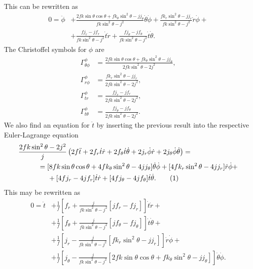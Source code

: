 \documentclass[english, parskip=full]{scrartcl}
\newcommand\numberthis{\addtocounter{equation}{1}\tag{\theequation}}
\newcommand{\kla}{}
\newcommand{\klam}{}
\begin{document}
This can be rewritten as
\begin{align}
0 = \ddot{\phi} &+ \frac{2fk\sin\theta\cos\theta + fk_\theta\sin^2\theta - jj_\theta}{fk\sin^2\theta - j^2} \dot{\theta}\dot{\phi} + \frac{fk_r\sin^2\theta - jj_r}{fk\sin^2\theta - j^2} \dot{r}\dot{\phi} + \\
&+ \frac{fj_r - jf_r}{fk\sin^2\theta - j^2} \dot{t}\dot{r} + \frac{fj_\theta - jf_\theta}{fk\sin^2\theta - j^2} \dot{t}\dot{\theta}.
\end{align}
The Christoffel symbols for $\phi$ are
\begin{align}
\Gamma^\phi_{\theta\phi} &= \frac{2fk\sin\theta\cos\theta + fk_\theta \sin^2\theta - jj_\theta}{2fk\sin^2\theta - 2j^2},\\
\Gamma^\phi_{r\phi} &= \frac{fk_r\sin^2\theta - jj_r}{2fk\sin^2\theta - 2j^2},\\
\Gamma^\phi_{tr} &= \frac{fj_r - jf_r}{2fk\sin^2\theta - 2j^2},\\
\Gamma^\phi_{t\theta} &= \frac{fj_\theta - jf_\theta}{2fk\sin^2\theta - 2j^2}.
\end{align}
We also find an equation for $\ddot{t}$ by inserting the previous result into the respective Euler-Lagrange equation
\begin{align*}
&\frac{2fk\sin^2\theta - 2j^2}{j} \kla\left( 2f\ddot{t} + 2f_r\dot{t}\dot{r} + 2f_\theta \dot{t}\dot{\theta} + 2j_r\dot{\phi}\dot{r} + 2j_\theta\dot{\phi}\dot{\theta} \right) = \\
&\hspace{1cm}= [8fk\sin\theta\cos\theta + 4fk_\theta\sin^2\theta  -4jj_\theta] \dot{\theta}\dot{\phi} + [4fk_r\sin^2\theta - 4jj_r] \dot{r}\dot{\phi} +\\
&\hspace{1.5cm} + [4fj_r - 4jf_r] \dot{t}\dot{r} + [4fj_\theta - 4jf_\theta] \dot{t}\dot{\theta} . \numberthis
\end{align*}
This may be rewritten as
\begin{align}
0 = \ddot{t} &+ \frac{1}{f} \klam\left[ f_r + \frac{j}{fk\sin^2\theta - j^2}[jf_r - fj_r] \right] \dot{t}\dot{r} + \\
&+ \frac{1}{f} \klam\left[ f_\theta + \frac{j}{fk\sin^2\theta - j^2}  [jf_\theta - fj_\theta] \right] \dot{t}\dot{\theta} + \\
&+ \frac{1}{f} \klam\left[ j_r - \frac{j}{fk\sin^2\theta - j^2} [fk_r\sin^2\theta - jj_r] \right] \dot{r}\dot{\phi} + \\
&+ \frac{1}{f} \klam\left[ j_\theta - \frac{j}{fk\sin^2\theta - j^2} [2fk\sin\theta\cos\theta + fk_\theta\sin^2\theta - jj_\theta] \right] \dot{\theta}\dot{\phi}.
\end{align}
\end{document}

